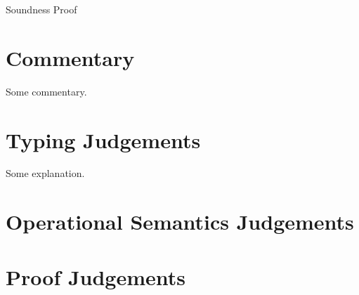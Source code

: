 \documentclass[11pt]{article}%
\makeatletter
\renewcommand\tableofcontents{\@starttoc{toc}}
\makeatother
\begin{document}
%

\begin{center}
{\LARGE Soundness Proof}
\end{center}

\vspace{1em}

\begin{abstract}
This document contains a proof of soundness of the explicit system, the rules are defined elsewhere.
\end{abstract}

{\let\clearpage\relax \tableofcontents}

\section{Commentary}
Some commentary.

\section{Typing Judgements}\label{sec:type_judge}

Some explanation.

\ottgrammartabular{
}

\section{Operational Semantics Judgements}\label{sec:opsem_judge}

\grammartabularSTY{
}

\section{Proof Judgements}\label{sec:proof_judge}

\grammartabularSTY{
}

\raggedright%
\end{document}
